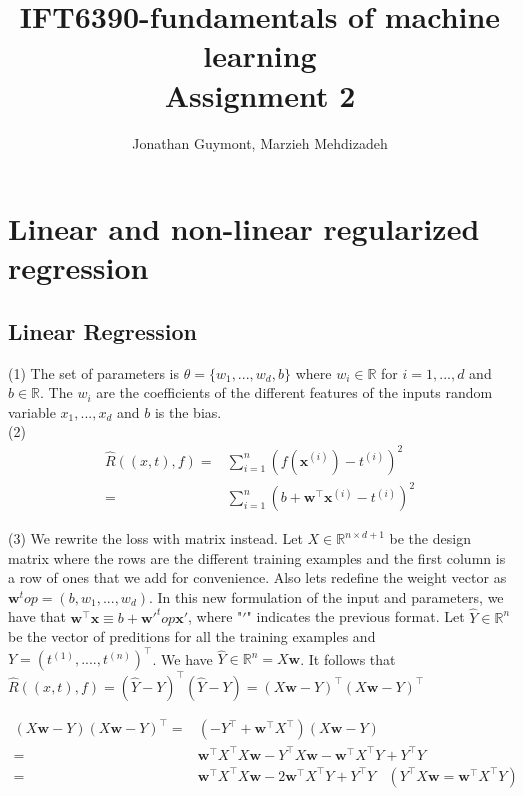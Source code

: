 \documentclass[11pt,english]{article}
\title{IFT6390-fundamentals of machine learning\\Assignment 2}
\author{Jonathan Guymont, Marzieh Mehdizadeh}
\date{}
\newcommand{\real}{\mathbb{R}}
\begin{document}
    \maketitle

    \section{Linear and non-linear regularized regression}

    \subsection{Linear Regression}

    (1) The set of parameters is $\theta=\{w_1,...,w_d, b\}$ where $w_i\in\real$ for $i=1,...,d$ and $b\in\real$. The $w_i$ are the coefficients of the different features of the inputs random variable $x_1,...,x_d$ and $b$ is the bias.\\

    (2) 
    \begin{equation}
        \begin{split}
            \hat{R}((x, t), f) 
            =& \sum_{i=1}^n (f(\bm{x}^{(i)})-t^{(i)})^2 \\
            =& \sum_{i=1}^n (b + \bm{w}^\top\bm{x}^{(i)}-t^{(i)})^2
        \end{split}
    \end{equation} 

    (3) We rewrite the loss with matrix instead. Let $X\in\real^{n\times d+1}$ be the design matrix where the rows are the different training examples and the first column is a row of ones that we add for convenience. Also lets redefine the weight vector as $\bm{w}^top=(b, w_1,...,w_d)$. In this new formulation of the input and parameters, we have that $\bm{w}^\top\bm{x}\equiv b + \bm{w}{'^top}\bm{x}'$, where "$'$" indicates the previous format. Let $\hat{Y}\in\real^n$ be the vector of preditions for all the training examples and $Y=(t^{(1)},....,t^{(n)})^\top$. We have $\hat{Y}\in\real^n=X\bm{w}$. It follows that $\hat{R}((x, t), f)=(\hat{Y}-Y)^\top(\hat{Y}-Y)=(X\bm{w}-Y)^\top(X\bm{w}-Y)^\top$

    \begin{equation}
        \begin{split}
            (X\bm{w}-Y)(X\bm{w}-Y)^\top 
            =& (-Y^\top + \bm{w}^\top X^\top)(X\bm{w}-Y) \\  
            =& \bm{w}^\top X^\top X\bm{w} - Y^\top X\bm{w} - \bm{w}^\top X^\top Y  + Y^\top Y  \\
            =& \bm{w}^\top X^\top X\bm{w} - 2\bm{w}^\top X^\top Y  + Y^\top Y~~~~(Y^\top X\bm{w}=\bm{w}^\top X^\top Y)  \\
        \end{split}
    \end{equation}
\end{document}
